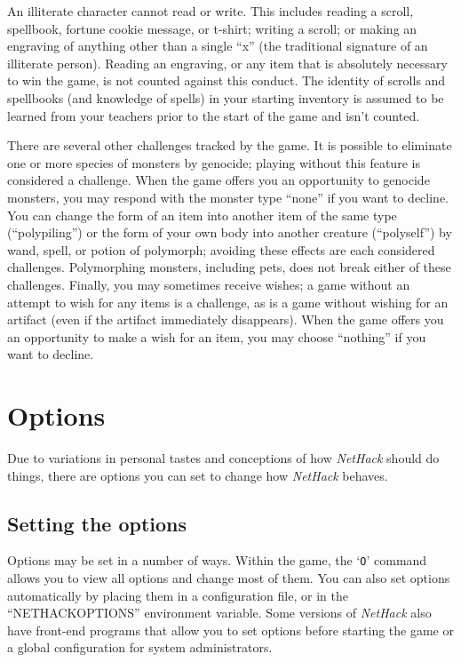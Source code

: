 An illiterate character cannot read or write.  This includes reading
a scroll, spellbook, fortune cookie message, or t-shirt; writing a
scroll; or making an engraving of anything other than a single ``x'' (the
traditional signature of an illiterate person).  Reading an engraving,
or any item that is absolutely necessary to win the game, is not counted
against this conduct.  The identity of scrolls and spellbooks (and
knowledge of spells) in your starting inventory is assumed to be
learned from your teachers prior to the start of the game and isn't
counted.

There are several other challenges tracked by the game.  It is possible
to eliminate one or more species of monsters by genocide; playing without
this feature is considered a challenge.  When the game offers you an
opportunity to genocide monsters, you may respond with the monster type
``none'' if you want to decline.  You can change the form of an item into
another item of the same type (``polypiling'') or the form of your own
body into another creature (``polyself'') by wand, spell, or potion of
polymorph; avoiding these effects are each considered challenges.
Polymorphing monsters, including pets, does not break either of these
challenges.
Finally, you may sometimes receive wishes; a game without an attempt to
wish for any items is a challenge, as is a game without wishing for
an artifact (even if the artifact immediately disappears).  When the
game offers you an opportunity to make a wish for an item, you may
choose ``nothing'' if you want to decline.

\section{Options}

Due to variations in personal tastes and conceptions of how {\it NetHack\/}
should do things, there are options you can set to change how {\it NetHack\/}
behaves.

\subsection*{Setting the options}

Options may be set in a number of ways.  Within the game, the `{\tt O}'
command allows you to view all options and change most of them.
You can also set options automatically by placing them in a configuration
file, or in the ``NETHACKOPTIONS'' environment variable.
Some versions of {\it NetHack\/} also have front-end programs that allow
you to set options before starting the game or a global configuration 
for system administrators.

